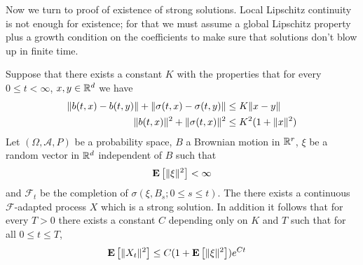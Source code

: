 Now we turn to proof of existence of strong solutions.  Local Lipschitz continuity is not enough for existence; for that we must assume a global Lipschitz property plus a growth condition on the coefficients to make sure that solutions don't blow up in finite time.
\begin{thm}Suppose that there exists a constant $K$ with the properties that for every $0 \leq t < \infty$, $x,y \in \mathbb{R}^d$ we have
\begin{align}\label{ExistenceSDELipschitz}
\lVert b(t,x) - b(t,y) \rVert + \lVert \sigma(t,x) - \sigma(t,y) \rVert &\leq K \lVert x-y \rVert \\
\label{ExistenceSDEGrowth}
\lVert b(t,x) \rVert^2 + \lVert \sigma(t,x) \rVert^2 &\leq K^2 (1 + \lVert x \rVert^2) 
\end{align}
Let $(\Omega, \mathcal{A}, P)$ be a probability space, $B$ a Brownian motion in $\mathbb{R}^r$, $\xi$ be a random vector in $\mathbb{R}^d$ independent of $B$ such that
\begin{align*}
\textbf{E}\left[\lVert \xi \rVert^2\right] < \infty
\end{align*}
and $\mathcal{F}_t$ be the completion of $\sigma(\xi, B_s ; 0 \leq s \leq t)$.  The there exists a continuous $\mathcal{F}$-adapted process $X$ which is a strong solution.  In addition it follows that for every $T > 0$ there exists a constant $C$ depending only on $K$ and $T$ such that for all $0 \leq t \leq T$,
\begin{align}\label{ExistenceSDEL2Bound}
\textbf{E}\left[\lVert X_t \rVert^2\right] &\leq C(1 + \textbf{E}\left[\lVert \xi \rVert^2\right]) e^{Ct}
\end{align}
\end{thm}
